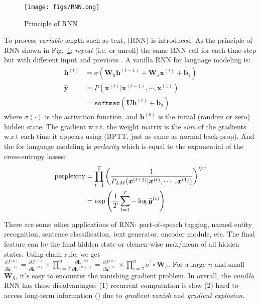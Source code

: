 \begin{figure}[!thp]
	\centerline{\texttt{[image: figs/RNN.png]}}
	\caption{Principle of RNN}
	\label{RNN}
\end{figure}


To process \emph{variable} length  such as text,  (RNN) is introduced.
As the principle of RNN shown in Fig.~\ref{RNN}: \emph{repeat} (i.e.  or unroll) the same RNN cell for each time-step but with different input and previous .
A vanilla RNN for language modeling is:
\begin{align}
\bm{h}^{(t)} &= \sigma \left(\bm{W}_h \bm{h}^{(t-1)} + \bm{W}_x \bm{x}^{(t)} + \bm{b}_1\right) \nonumber \\
\hat{\bm{y}} &= P(\bm{x}^{(t)} | \bm{x}^{(t-1)}, \cdots, \bm{x}^{(1)}) \nonumber \nonumber \\
&= \texttt{softmax}(\bm{U}\bm{h}^{(t)} + \bm{b}_2) \nonumber
\end{align}
where $\sigma(\cdot)$ is the activation function, and $\bm{h}^{(0)}$ is the initial (random or zero) hidden state.
The gradient w.r.t. the weight matrix is the \emph{sum} of the gradients w.r.t each time it appears using  (BPTT, just as same as normal back-prop).
And the  for language modeling is \emph{perlexity} which is equal to the exponential of the cross-entropy losses:
\begin{align}
\text{perplexity} &= \prod_{t=1}^T \left(\frac{1}{P_{LM} (\bm{x}^{(t+1)} | \bm{x}^{(t)}, \cdots, \bm{x}^{(1)})}\right)^{\nicefrac{1}{T}} \nonumber \\
&= \exp\left(\frac{1}{T} \sum_{t=1}^T -\log \hat{\bm{y}}^{(t)}\right)
\end{align}

There are some other applications of RNN: part-of-speech tagging, named entity recognition, sentence classification, text generator, encoder module, etc.
The final feature can be the final hidden state or elemen-wise max/mean of all hidden states.
Using chain rule, we get $\frac{\partial J^{(n)}}{\partial \bm{h}^{(1)}} = \frac{\partial J^{(n)}}{\partial \bm{h}^{(n)}} \times \prod_{i=2}^n \frac{\partial \bm{h}^{(n)}}{\partial \bm{h}^{(n-1)}} = \frac{\partial J^{(n)}}{\partial \bm{h}^{(n)}} \times \prod_{i=2}^n \sigma^\prime \circ \bm{W}_h$.
For a large $n$ and small $\bm{W}_h$, it's easy to encounter the vanishing gradient problem.
In overall, the \emph{vanilla} RNN has these disadvantages: (1) recurrent computation is slow (2) hard to access long-term information () due to \emph{gradient vanish} and \emph{gradient explosion}.

